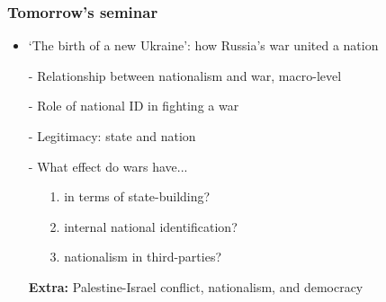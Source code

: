 \documentclass[aspectratio=43]{beamer}
\begin{document}
\begin{frame}
\frametitle{Tomorrow's seminar}
\centering

\begin{itemize}
  \item `The birth of a new Ukraine': how Russia's war united a nation
  \item[]
  \item[-] Relationship between nationalism and war, macro-level
  \item[-] Role of national ID in fighting a war
  \item[-] Legitimacy: state and nation
  \item[-] What effect do wars have...
  \begin{itemize}
    \item[1.] in terms of state-building?
    \item[2.] internal national identification?
    \item[3.] nationalism in third-parties?
  \end{itemize}
  \item[] \textbf{Extra:} Palestine-Israel conflict, nationalism, and democracy 
\end{itemize}

\end{frame}
\end{document}
